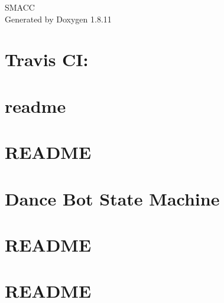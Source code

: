 \documentclass[twoside]{book}
\newcommand{\+}{\discretionary{\mbox{\scriptsize$\hookleftarrow$}}{}{}}
\newcommand{\clearemptydoublepage}{%
  \newpage{\pagestyle{empty}\cleardoublepage}%
}
\begin{document}
\hypersetup{pageanchor=false,
             bookmarksnumbered=true,
             pdfencoding=unicode
            }
\begin{titlepage}
\vspace*{7cm}
\begin{center}%
{\Large S\+M\+A\+CC }\\
\vspace*{1cm}
{\large Generated by Doxygen 1.8.11}\\
\end{center}
\end{titlepage}
\clearemptydoublepage
\tableofcontents
\clearemptydoublepage
{}
\hypersetup{pageanchor=true}

\chapter{Travis CI\+:}
\label{md_README}
\hypertarget{md_README}{}

\chapter{readme}
\label{md_smacc_diagnostics_readme}
\hypertarget{md_smacc_diagnostics_readme}{}

\chapter{R\+E\+A\+D\+ME}
\label{md_smacc_sm_reference_library_sm_atomic_README}
\hypertarget{md_smacc_sm_reference_library_sm_atomic_README}{}

\chapter{Dance Bot State Machine}
\label{md_smacc_sm_reference_library_sm_dance_bot_launch_readme}
\hypertarget{md_smacc_sm_reference_library_sm_dance_bot_launch_readme}{}

\chapter{R\+E\+A\+D\+ME}
\label{md_smacc_sm_reference_library_sm_dance_bot_README}
\hypertarget{md_smacc_sm_reference_library_sm_dance_bot_README}{}

\chapter{R\+E\+A\+D\+ME}
\label{md_smacc_sm_reference_library_sm_three_some_README}
\hypertarget{md_smacc_sm_reference_library_sm_three_some_README}{}

\end{document}
